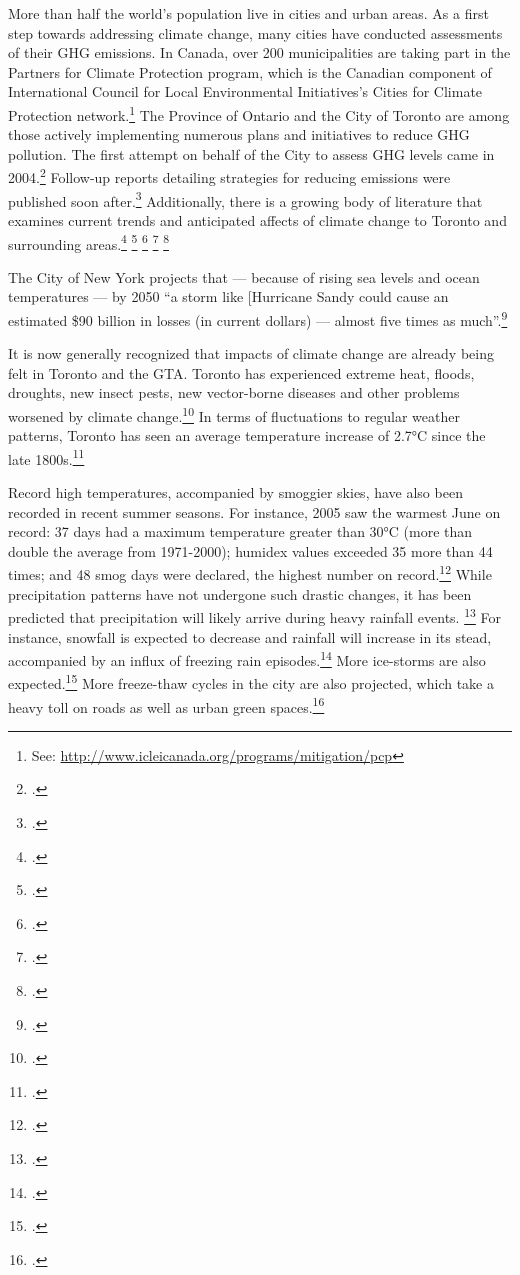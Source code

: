 More than half the world's population live in cities and urban areas. 
As a first step towards addressing climate change, many cities have conducted assessments of their GHG emissions. 
In Canada, over 200 municipalities are taking part in the Partners for Climate Protection  program, which is the Canadian component of International Council for Local Environmental Initiatives's Cities for Climate Protection network.\footnote{See: \url{http://www.icleicanada.org/programs/mitigation/pcp}}
The Province of Ontario and the City of Toronto are among those actively implementing numerous plans and initiatives to reduce GHG pollution. 
The first attempt on behalf of the City to assess GHG levels came in 2004.\footcite[][p. IV]{GHGPollutionToronto}
Follow-up reports detailing strategies for reducing emissions were published soon after.\footcite[][]{CCAHealthEquity}
Additionally, there is a growing body of literature that examines current trends and anticipated affects of climate change to Toronto and surrounding areas.\footcite[][]{TorontoEnvOff2007} \footcite[][]{TorontoAheadStorm} \footcite[][]{ScanCCToronto} \footcite[][]{AdaptPrioritiesCanada} \footcite[][]{MacLeodAdaptation}



The City of New York projects that --- because of rising sea levels and ocean temperatures --- by 2050 ``a storm like [Hurricane Sandy could cause an estimated \$90 billion in losses (in current dollars) --- almost five times as much''.\footcite[][Foreward, p. 2]{ResilientNewYork}



It is now generally recognized that impacts of climate change are already being felt in Toronto and the GTA.
Toronto has experienced extreme heat, floods, droughts, new insect pests, new vector-borne diseases and other problems worsened by climate change.\footcite[][]{TorontoAheadStorm}
In terms of fluctuations to regular weather patterns, Toronto has seen an average temperature increase of 2.7°C since the late 1800s.\footcite[][p. 5]{ScanCCToronto}



Record high temperatures, accompanied by smoggier skies, have also been recorded in recent summer seasons. 
For instance, 2005 saw the warmest June on record: 37 days had a maximum temperature greater than 30°C (more than double the average from 1971-2000); humidex values exceeded 35 more than 44 times; and 48 smog days were declared, the highest number on record.\footcite[][p. iii, p. 7]{ScanCCToronto}
While precipitation patterns have not undergone such drastic changes, it has been predicted that precipitation will likely arrive during heavy rainfall events. \footcite[][p. 6]{ScanCCToronto}
For instance, snowfall is expected to decrease and rainfall will increase in its stead, accompanied by an influx of freezing rain episodes.\footcite[][p. 8]{TorontoAheadStorm}
More ice-storms are also expected.\footcite[][]{FreezingRain2007}
More freeze-thaw cycles in the city are also projected, which take a heavy toll on roads as well as urban green spaces.\footcite[][p. 8]{TorontoAheadStorm}



